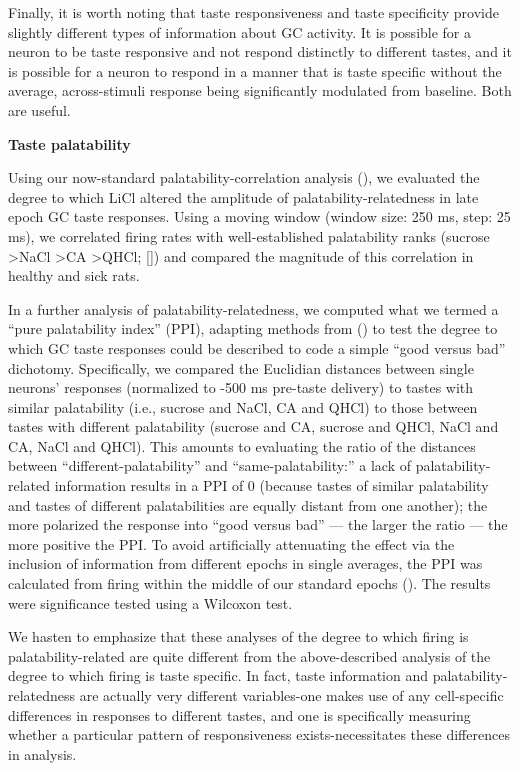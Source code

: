 \begin{refsection}
Finally, it is worth noting that taste responsiveness and taste specificity provide slightly different types of information about GC activity. It is possible for a neuron to be taste responsive and not respond distinctly to different tastes, and it is possible for a neuron to respond in a manner that is taste specific without the average, across-stimuli response being significantly modulated from baseline. Both are useful.

\smallskip
\noindent\textbf{Taste palatability}\par
\noindent 
Using our now-standard palatability-correlation analysis (\cite{sadacca2016a,moran2014a,li2016a,piette2012a}), we evaluated the degree to which LiCl altered the amplitude of palatability-relatedness in late epoch GC taste responses. Using a moving window (window size: 250 ms, step: 25 ms), we correlated firing rates with well-established palatability ranks (sucrose \textgreater NaCl \textgreater CA \textgreater QHCl; [\cite{sadacca2016a,li2013a}]) and compared the magnitude of this correlation in healthy and sick rats.

In a further analysis of palatability-relatedness, we computed what we termed a “pure palatability index” (PPI), adapting methods from (\cite{fontanini2009a}) to test the degree to which GC taste responses could be described to code a simple “good versus bad” dichotomy. Specifically, we compared the Euclidian distances between single neurons’ responses (normalized to -500 ms pre-taste delivery) to tastes with similar palatability (i.e., sucrose and NaCl, CA and QHCl) to those between tastes with different palatability (sucrose and CA, sucrose and QHCl, NaCl and CA, NaCl and QHCl). This amounts to evaluating the ratio of the distances between “different-palatability” and “same-palatability:” a lack of palatability-related information results in a PPI of 0 (because tastes of similar palatability and tastes of different palatabilities are equally distant from one another); the more polarized the response into “good versus bad” --- the larger the ratio --- the more positive the PPI. To avoid artificially attenuating the effect via the inclusion of information from different epochs in single averages, the PPI was calculated from firing within the middle of our standard epochs (\cite{katz-a,katz2001a}). The results were significance tested using a Wilcoxon test.

We hasten to emphasize that these analyses of the degree to which firing is palatability-related are quite different from the above-described analysis of the degree to which firing is taste specific. In fact, taste information and palatability-relatedness are actually very different variables-one makes use of any cell-specific differences in responses to different tastes, and one is specifically measuring whether a particular pattern of responsiveness exists-necessitates these differences in analysis.


\end{refsection}
